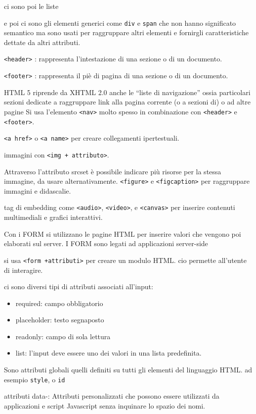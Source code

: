 \documentclass[12pt]{article}
\begin{document}
ci sono poi le liste

e poi ci sono gli elementi generici come \texttt{div} e \texttt{span} che non hanno significato semantico ma sono usati per raggruppare altri elementi e fornirgli caratteristiche dettate da altri attributi.

\texttt{<header>} : rappresenta l'intestazione di una sezione o di un documento.

\texttt{<footer>} : rappresenta il piè di pagina di una sezione o di un documento.

HTML 5 riprende da XHTML 2.0 anche le “liste di navigazione” ossia particolari
sezioni dedicate a raggruppare link alla pagina corrente (o a sezioni di) o ad
altre pagine
Si usa l’elemento \texttt{<nav>} molto spesso in combinazione con \texttt{<header>} e
\texttt{<footer>}.


\texttt{<a href>} o \texttt{<a name>} per creare collegamenti ipertestuali.

immagini con \texttt{<img + attributo>}.

Attraverso l'attributo srcset è possibile indicare più risorse per la stessa
immagine, da usare alternativamente.
\texttt{<figure>} e \texttt{<figcaption>} per raggruppare immagini e didascalie.

tag di embedding come \texttt{<audio>}, \texttt{<video>}, e \texttt{<canvas>} per
inserire contenuti multimediali e grafici interattivi.

Con i FORM si utilizzano le pagine HTML per inserire valori che
vengono poi elaborati sul server. I FORM sono legati ad
applicazioni server-side

si usa \texttt{<form +attributi>} per creare un modulo HTML. cio permette all'utente di interagire.

ci sono diversi tipi di attributi associati all'input:
\begin{itemize}
    \item required: campo obbligatorio
    \item placeholder: testo segnaposto
    \item readonly: campo di sola lettura
    \item list: l'input deve essere uno dei valori in una lista predefinita.
     \end{itemize}
    
     Sono attributi globali quelli definiti su tutti gli elementi del
linguaggio HTML.
 ad esempio \texttt{style}, o \texttt{id}

 attributi data-: Attributi personalizzati che possono essere utilizzati da applicazioni e script
Javascript senza inquinare lo spazio dei nomi.
\end{document}
